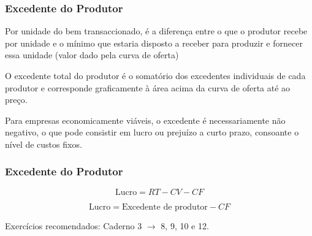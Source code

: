 \begin{frame}
	\frametitle{Excedente do Produtor}
	Por unidade do bem transaccionado, \'e a diferen\c ca entre o que o produtor recebe por unidade e o m\'inimo que estaria disposto a receber para produzir e fornecer essa unidade (valor dado pela curva de oferta)
	
	\vspace{0.5cm}

	O excedente total do produtor \'e o somat\'orio dos excedentes individuais de cada produtor e corresponde graficamente \`a \'area acima da curva de oferta at\'e ao pre\c co.

	\vspace{0.5cm}

	Para empresas economicamente vi\'aveis, o excedente \'e necessariamente n\~ao negativo, o que pode consistir em lucro ou preju\'izo a curto prazo, consoante o n\'ivel de custos fixos.
\end{frame}

\begin{frame}
	\frametitle{Excedente do Produtor}

	\[\text{Lucro}=RT-CV-CF\] 

	\vspace{1cm}

	\[\text{Lucro} = \text{Excedente de produtor} - CF\]

	\vspace{1cm}

	Exerc\'icios recomendados: Caderno 3 $\rightarrow$ 8, 9, 10 e 12.
\end{frame}